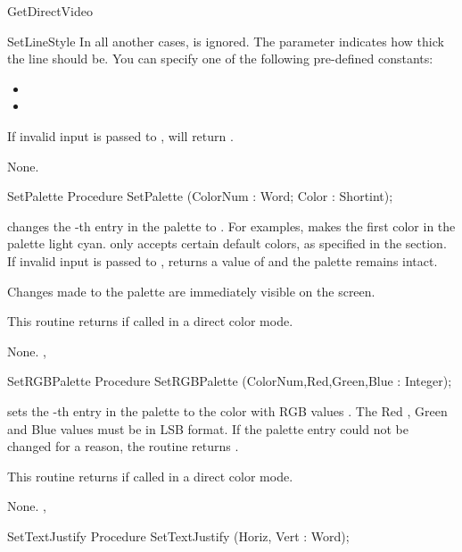 \begin{function}{GetDirectVideo}
\begin{procedure}{SetLineStyle}
In all another cases,  is ignored. The parameter 
indicates how thick the line should be. You can specify one of the following
pre-defined constants:
\begin{itemize}
\item {}
\item {}
\end{itemize}

If invalid input is passed to  ,  will
return .

\Errors
None.
\SeeAlso
{}
\end{procedure}
\begin{procedure}{SetPalette}
\Declaration
Procedure SetPalette (ColorNum : Word; Color : Shortint);

\Description
{} changes the -th entry in the palette to
. For examples,  makes the first
color in the palette light cyan.  only accepts certain default
colors, as specified in the  section. If invalid
input is passed to ,  returns a value
of  and the palette remains intact.

Changes made to the palette are immediately visible on the screen.

This routine returns  if called in a direct color mode.

\Errors
None.
\SeeAlso
{},
\end{procedure}
\begin{procedure}{SetRGBPalette}
\Declaration
Procedure SetRGBPalette (ColorNum,Red,Green,Blue : Integer);

\Description
{} sets the -th entry in the palette to the
color with RGB values . The Red , Green and Blue values
must be in LSB format. If the palette entry could not be changed for a
reason, the routine returns .

This routine returns  if called in a direct color mode.

\Errors
None.
\SeeAlso
{},
\end{procedure}
\begin{procedure}{SetTextJustify}
\Declaration
Procedure SetTextJustify (Horiz, Vert : Word);


\end{procedure}
\end{function}

